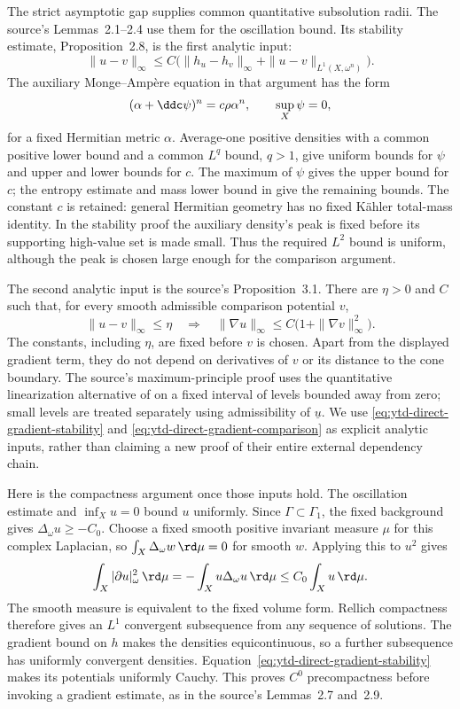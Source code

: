 The strict asymptotic gap supplies common quantitative
subsolution radii. The source's Lemmas~2.1--2.4 use them for
the oscillation bound. Its stability estimate, Proposition~2.8,
is the first analytic input:
\[
\tag{68.23dg}\label{eq:ytd-direct-gradient-stability}
 \|u-v\|_\infty\leq
 C\bigl(\|h_u-h_v\|_\infty+\|u-v\|_{L^1(X,\omega^n)}\bigr).
\]
The auxiliary Monge--Amp\`ere equation in that argument has
the form
\[
 (\alpha+\ddc\psi)^n=c\rho\alpha^n,
 \qquad \sup_X\psi=0,
\]
for a fixed Hermitian metric $\alpha$.
Average-one positive densities with a common positive lower
bound and a common $L^q$ bound, $q>1$, give uniform bounds
for $\psi$ and upper and lower bounds for $c$.
The maximum of $\psi$ gives the upper bound for $c$;
the entropy estimate and mass lower bound in
\cite[Theorem~1 and Corollary~1]{GuoPhong23LinftyV3}
give the remaining bounds.
The constant $c$ is retained: general Hermitian geometry has
no fixed K\"ahler total-mass identity.
In the stability proof the auxiliary density's peak is fixed
before its supporting high-value set is made small. Thus the
required $L^2$ bound is uniform, although the peak is chosen
large enough for the comparison argument.

The second analytic input is the source's Proposition~3.1.
There are $\eta>0$ and $C$ such that, for every smooth
admissible comparison potential $v$,
\[
\tag{68.23dh}\label{eq:ytd-direct-gradient-comparison}
 \|u-v\|_\infty\leq\eta
 \quad\Longrightarrow\quad
 \|\nabla u\|_\infty
       \leq C\bigl(1+\|\nabla v\|_\infty^2\bigr).
\]
The constants, including $\eta$, are fixed before $v$ is
chosen. Apart from the displayed gradient term, they do not
depend on derivatives of $v$ or its distance to the cone
boundary. The source's maximum-principle proof uses the
quantitative linearization alternative of
\cite[Proposition~6]{Szekelyhidi15FullyNonlinearV3} on a
fixed interval of levels bounded away from zero; small
levels are treated separately using admissibility of
$\underline u$. We use
\eqref{eq:ytd-direct-gradient-stability} and
\eqref{eq:ytd-direct-gradient-comparison} as explicit
analytic inputs, rather than claiming a new proof of
their entire external dependency chain.

Here is the compactness argument once those inputs hold.
The oscillation estimate and $\inf_Xu=0$ bound $u$ uniformly.
Since $\Gamma\subset\Gamma_1$, the fixed background gives
$\Delta_\omega u\geq-C_0$.
Choose a fixed smooth positive invariant measure $\mu$ for
this complex Laplacian, so $\int_X\Delta_\omega w\,\rd\mu=0$
for smooth $w$. Applying this to $u^2$ gives
\[
 \int_X|\partial u|_\omega^2\,\rd\mu
   =-\int_Xu\Delta_\omega u\,\rd\mu
   \leq C_0\int_Xu\,\rd\mu.
\]
The smooth measure is equivalent to the fixed volume form.
Rellich compactness therefore gives an $L^1$ convergent
subsequence from any sequence of solutions.
The gradient bound on $h$ makes the densities equicontinuous,
so a further subsequence has uniformly convergent densities.
Equation~\eqref{eq:ytd-direct-gradient-stability} makes its
potentials uniformly Cauchy. This proves $C^0$ precompactness
before invoking a gradient estimate, as in the source's
Lemmas~2.7 and~2.9.

